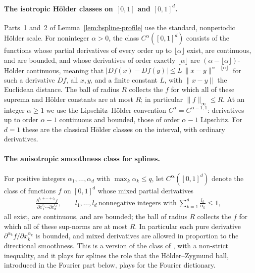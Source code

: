 \paragraph*{\boldmath The isotropic H\"older classes on $[0,1]$ and $[0,1]^d$.}
Parts~1 and~2 of Lemma~\ref{lem:bspline-profile} use the standard, nonperiodic H\"older scale. For noninteger $\alpha>0$, the class $C^\alpha([0,1]^d)$ consists of the functions whose partial derivatives of every order up to $\lfloor\alpha\rfloor$ exist, are continuous, and are bounded, and whose derivatives of order exactly $\lfloor\alpha\rfloor$ are $(\alpha-\lfloor\alpha\rfloor)$-H\"older continuous, meaning that $|D f(x)-D f(y)|\leq L\,\|x-y\|^{\alpha-\lfloor\alpha\rfloor}$ for such a derivative $Df$, all $x,y$, and a finite constant $L$, with $\|x-y\|$ the Euclidean distance. The ball of radius $R$ collects the $f$ for which all of these suprema and H\"older constants are at most $R$; in particular $\|f\|_\infty\leq R$. At an integer $\alpha\geq1$ we use the Lipschitz--H\"older convention $C^\alpha=C^{\alpha-1,1}$: derivatives up to order $\alpha-1$ continuous and bounded, those of order $\alpha-1$ Lipschitz. For $d=1$ these are the classical H\"older classes on the interval, with ordinary derivatives.

\paragraph*{The anisotropic smoothness class for splines.}
For positive integers $\alpha_1,\ldots,\alpha_d$ with $\max_k\alpha_k\leq q$, let $C^{\boldsymbol\alpha}([0,1]^d)$ denote the class of functions $f$ on $[0,1]^d$ whose mixed partial derivatives
\begin{align*}
\frac{\partial^{l_1+\cdots+l_d}f}
{\partial x_1^{l_1}\cdots\partial x_d^{l_d}},
\qquad
l_1,\ldots,l_d\ \text{nonnegative integers with}\
\sum_{k=1}^d\frac{l_k}{\alpha_k}\leq1,
\end{align*}
all exist, are continuous, and are bounded; the ball of radius $R$ collects the $f$ for which all of these sup-norms are at most $R$. In particular each pure derivative $\partial^{\alpha_k}f/\partial x_k^{\alpha_k}$ is bounded, and mixed derivatives are allowed in proportion to the directional smoothness. This is a version of the class of \citet[Section~3.2]{ShenGhosal2015}, with a non-strict inequality, and it plays for splines the role that the H\"older--Zygmund ball, introduced in the Fourier part below, plays for the Fourier dictionary.

